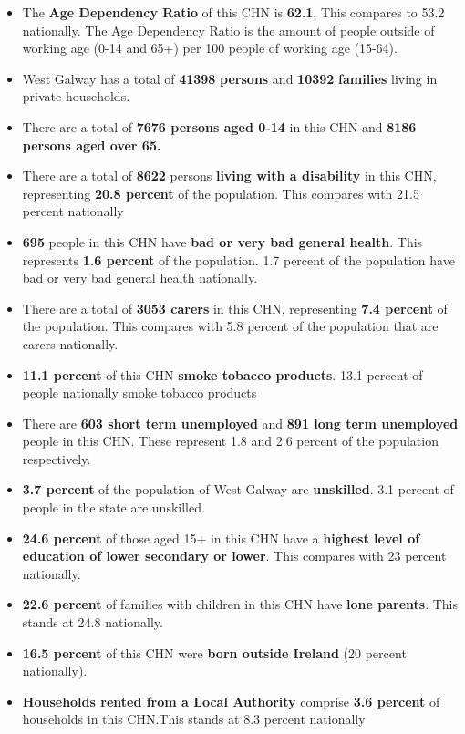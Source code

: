 \documentclass{article}
\begin{document}
\begin{itemize}

\item The \textbf{Age Dependency Ratio} of this CHN is  \textbf{62.1}. This compares to 53.2 nationally. The Age Dependency Ratio is the amount of people outside of working age (0-14 and 65+) per 100 people of working age (15-64). 

\item West Galway has a total of \textbf{\num{41398}} \textbf{persons} and  \textbf{\num{10392}} \textbf{families} living in private households.

\item There are a total of \textbf{\num{7676} persons aged 0-14} in this CHN and \textbf{\num{8186} persons aged over 65.} 

\item There are a total of \textbf{\num{8622}} persons \textbf{living with a disability} in this CHN, representing \textbf{20.8 percent} of the population. This compares with  21.5 percent nationally

\item \textbf{\num{695}} people in this CHN have \textbf{bad or very bad general health}. This represents \textbf{1.6 percent} of the population. 1.7 percent of the population have bad or very bad general health nationally. 

\item There are a total of \textbf{\num{3053} carers} in this CHN, representing \textbf{7.4 percent} of the population. This compares with 5.8 percent of the population that are carers nationally. 

\item \textbf{11.1 percent} of this CHN \textbf{smoke tobacco products}. 13.1 percent of people nationally smoke tobacco products

\item There are \textbf{\num{603} short term unemployed} and \textbf{\num{891} long term unemployed} people in this CHN. These represent 1.8 and 2.6 percent of the population respectively.

\item  \textbf{3.7 percent} of the population of West Galway are \textbf{unskilled}. 3.1 percent of people in the state are unskilled.

\item \textbf{24.6 percent} of those aged 15+ in this CHN have a \textbf{highest level of education of lower secondary or lower}. This compares with 23 percent nationally. 

\item \textbf{22.6 percent} of families with children in this CHN have \textbf{lone parents}. This stands at 24.8 nationally.

\item \textbf{16.5 percent} of this CHN were \textbf{born outside Ireland} (20 percent nationally).

\item \textbf{Households rented from a Local Authority} comprise \textbf{3.6 percent} of households in this CHN.This stands at 8.3 percent nationally

\end{itemize}
\end{document}
